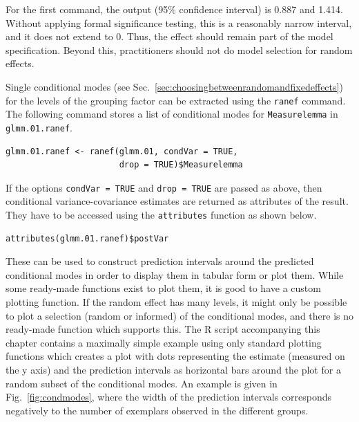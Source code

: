 For the first command, the output (95\% confidence interval) is 0.887 and 1.414.
Without applying formal significance testing, this is a reasonably narrow interval, and it does not extend to 0.
Thus, the effect should remain part of the model specification.
Beyond this, practitioners should not do model selection for random effects.

Single conditional modes (see Sec.~\ref{sec:choosingbetweenrandomandfixedeffects}) for the levels of the grouping factor can be extracted using the \texttt{ranef} command.
The following command stores a list of conditional modes for \texttt{Measurelemma} in \texttt{glmm.01.ranef}.

\vspace{0.5\baselineskip}

\begin{lstlisting}
glmm.01.ranef <- ranef(glmm.01, condVar = TRUE,
                       drop = TRUE)$Measurelemma
\end{lstlisting}

If the options \texttt{condVar = TRUE} and \texttt{drop = TRUE} are passed as above, then conditional variance-covariance estimates are returned as attributes of the result.
They have to be accessed using the \texttt{attributes} function as shown below.

\vspace{0.5\baselineskip}

\begin{lstlisting}
attributes(glmm.01.ranef)$postVar
\end{lstlisting}

These can be used to construct prediction intervals around the predicted conditional modes in order to display them in tabular form or plot them.
While some ready-made functions exist to plot them, it is good to have a custom plotting function.
If the random effect has many levels, it might only be possible to plot a selection (random or informed) of the conditional modes, and there is no ready-made function which supports this.
The R script accompanying this chapter contains a maximally simple example using only standard plotting functions which creates a plot with dots representing the estimate (measured on the y axis) and the prediction intervals as horizontal bars around the plot for a random subset of the conditional modes.
An example is given in Fig.~\ref{fig:condmodes}, where the width of the prediction intervals corresponds negatively to the number of exemplars observed in the different groups.

